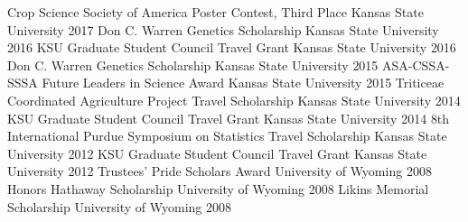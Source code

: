 
\begin{cvawards}
  \cvaward
    {Crop Science Society of America Poster Contest, Third Place} %
    {Kansas State University} %
    {2017} %
  \cvaward
    {Don C. Warren Genetics Scholarship} %
    {Kansas State University} %
    {2016} %
  \cvaward
    {KSU Graduate Student Council Travel Grant} %
    {Kansas State University} %
    {2016} %
  \cvaward
    {Don C. Warren Genetics Scholarship} %
    {Kansas State University} %
    {2015} %
  \cvaward
    {ASA-CSSA-SSSA Future Leaders in Science Award} %
    {Kansas State University} %
    {2015} %
  \cvaward
    {Triticeae Coordinated Agriculture Project Travel Scholarship} %
    {Kansas State University} %
    {2014} %
  \cvaward
    {KSU Graduate Student Council Travel Grant} %
    {Kansas State University} %
    {2014} %
  \cvaward
    {8th International Purdue Symposium on Statistics Travel Scholarship} %
    {Kansas State University} %
    {2012} %
  \cvaward
    {KSU Graduate Student Council Travel Grant} %
    {Kansas State University} %
    {2012} %
  \cvaward
    {Trustees' Pride Scholars Award} %
    {University of Wyoming} %
    {2008} %
  \cvaward
    {Honors Hathaway Scholarship} %
    {University of Wyoming} %
    {2008} %
  \cvaward
    {Likins Memorial Scholarship} %
    {University of Wyoming} %
    {2008} %

\end{cvawards}


